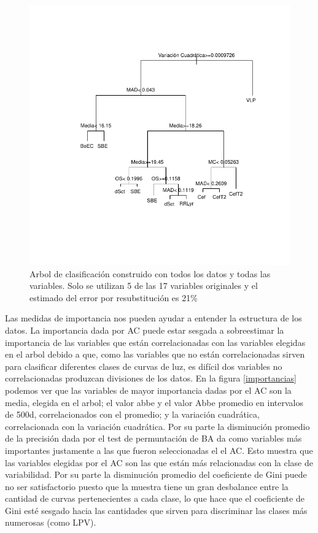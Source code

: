 \documentclass[letterpaper,12pt]{book}
\begin{document}
\begin{figure}
  \centering
  \includegraphics[width = \textwidth]{./img/CClasificacion/arbolTotal.pdf}
  \caption{Arbol de clasificación construido con todos los datos y todas las variables. Solo se utilizan 5 de las 17 variables originales y el estimado del error por resubstitución es 21\%}
  \label{fig:arbolTotal}
  \centering
\end{figure}

Las medidas de importancia nos pueden ayudar a entender la estructura de los datos. La importancia dada por AC puede estar sesgada a sobreestimar la importancia de las variables que están correlacionadas con las variables elegidas en el arbol debido a que, como las variables que no están correlacionadas sirven para clasificar diferentes clases de curvas de luz, es difícil dos variables no correlacionadas produzcan divisiones de los datos. En la figura \ref{importancias} podemos ver que las variables de mayor importancia dadas por el AC son la media, elegida en el arbol; el valor abbe y el valor Abbe promedio en intervalos de 500d, correlacionados con el promedio;  y la variación cuadrática, correlacionada con la variación cuadrática. Por su parte la disminución promedio de la precisión dada por el test de permuntación de BA da como variables más importantes justamente a las que fueron seleccionadas el el AC. Esto muestra que las variables elegidas por el AC son las que están más relacionadas con la clase de variabilidad. Por su parte la disminución promedio del coeficiente de Gini puede no ser satisfactorio puesto que la muestra tiene un gran desbalance entre la cantidad de curvas pertenecientes a cada clase, lo que hace que el coeficiente de Gini esté sesgado hacia las cantidades que sirven para discriminar las clases más numerosas (como LPV). 
\end{document}
